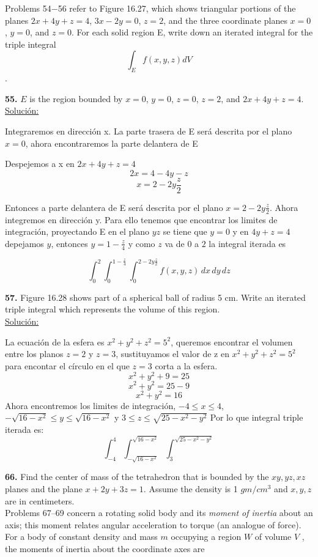 \documentclass[11pt]{report}
\newcommand{\s}{\underline{Soluci\'{o}n:}}
\begin{document}
Problems 54$-$56 refer to Figure 16.27, which shows triangular portions of the
planes $2x+4y+z = 4$,
$3x-2y=0$, $z = 2$,
and the three coordinate planes $x = 0$, $y = 0$, and $z = 0$.
For each solid region E, write down an iterated integral for
the triple integral $$\int_E f(x, y, z) dV$$.

\textbf{55.} $E$ is the region bounded by $x = 0$, $y = 0$, $z = 0$, $z = 2$,
and $2x + 4y + z = 4$. \\
\s

Integraremos en direcci\'{o}n x. La parte trasera de E ser\'{a} descrita por
el plano $x = 0$, ahora encontraremos la parte delantera de E

Despejemos a x en $2x + 4y + z = 4$
\[2x = 4 - 4y - z\]
\[x = 2 - 2y \frac{z}{2}\]

Entonces a parte delantera de E ser\'{a} descrita por el plano $x = 2 - 2y \frac{z}{2}$.
Ahora integremos en direcci\'{o}n y. Para ello tenemos que encontrar los
limites de integraci\'{o}n, proyectando E en el plano $yz$ se tiene que
$y = 0$ y en $4y + z = 4$ depejamos $y$, entonces
$y = 1 - \frac{z}{4}$ y como $z$ va de $0$ a $2$ la integral iterada es

\[\int^{2}_{0}\int^{1 - \frac{z}{4}}_{0}\int^{2 - 2y \frac{z}{2}}_{0}  f(x, y, z) \, dx \, dy \, dz\]

\textbf{57.} Figure 16.28 shows part of a spherical ball of radius 5 cm.
Write an iterated triple integral which represents the volume of this region. \\
\s

La ecuaci\'{o}n de la esfera es $x^2 + y^2 + z^2 = 5^2$, queremos encontrar el
volumen entre los planos $z = 2$ y $z = 3$, sustituyamos el valor de z en
$x^2 + y^2 + z^2 = 5^2$ para encontar el c\'{i}rculo en el que $z = 3$ corta a la
esfera.
\[x^2 + y^2 + 9 = 25 \]
\[x^2 + y^2 = 25 - 9\]
\[x^2 + y^2 = 16 \]
Ahora encontremos los limites de integraci\'{o}n, $-4 \leq x \leq 4$,
$-\sqrt{16 - x^2} \leq y \leq \sqrt{16 - x^2}$ y $3 \leq z \leq \sqrt{25 - x^2 - y^2}$
Por lo que integral triple iterada es:
\[\int^{4}_{-4}\int^{\sqrt{16 - x^2}}_{-\sqrt{16 - x^2}}\int^{\sqrt{25 - x^2 - y^2}}_{3}\]

\textbf{66.} Find the center of mass of the tetrahedron that is bounded by the
$xy, yz, xz$ planes and the plane $x + 2y + 3z = 1$. Assume the density is
1 $gm/cm^3$ and $x, y, z$ are in centimeters. \\

Problems 67–69 concern a rotating solid body and its \textit{moment of inertia}
about an axis; this moment relates angular acceleration to torque (an analogue
of force). For a body of constant density and mass $m$ occupying a region $W$
of volume $V$ , the moments of inertia about the coordinate axes are
\end{document}
